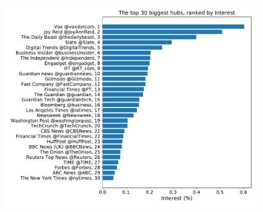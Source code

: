\documentclass[11pt, twoside]{report}
\begin{document}
    
    \begin{figure}[htbp]
      \centering
      \includegraphics[width=\textwidth]{../../scripts/network_analysis/imgs/hubs_interest.pdf}            
      \caption{}
    \end{figure}

\newpage    
\end{document}
